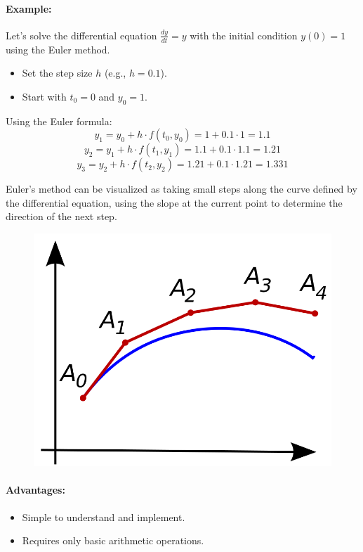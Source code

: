 \paragraph{Example:} Let's solve the differential equation \( \frac{dy}{dt} = y \) with the initial condition \( y(0) = 1 \) using the Euler method.

\begin{itemize}
	\item Set the step size \( h \) (e.g., \( h = 0.1 \)).
	\item Start with \( t_0 = 0 \) and \( y_0 = 1 \).
\end{itemize}

Using the Euler formula:
\[ y_{1} = y_0 + h \cdot f(t_0, y_0) = 1 + 0.1 \cdot 1 = 1.1 \]
\[ y_{2} = y_1 + h \cdot f(t_1, y_1) = 1.1 + 0.1 \cdot 1.1 = 1.21 \]
\[ y_{3} = y_2 + h \cdot f(t_2, y_2) = 1.21 + 0.1 \cdot 1.21 = 1.331 \]

Euler's method can be visualized as taking small steps along the curve defined by the differential equation, using the slope at the current point to determine the direction of the next step.

\begin{figure}[h]
	\centering
	\includegraphics[scale=0.3]{./images/node/euler_method.png}
\end{figure}

\paragraph{Advantages:}
\begin{itemize}
	\item Simple to understand and implement.
	\item Requires only basic arithmetic operations.
\end{itemize}
